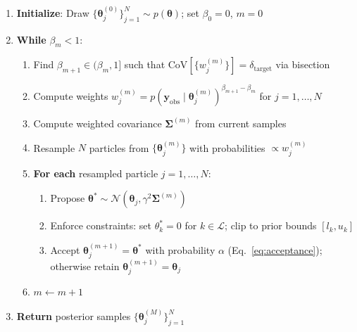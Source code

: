 \documentclass[11pt,a4paper]{article}
\begin{document}
\begin{algorithm}[htbp]
{\begin{minipage}{0.92\textwidth}
\begin{enumerate}
    \item[\textbf{1.}] \textbf{Initialize}: Draw $\{\boldsymbol{\theta}_j^{(0)}\}_{j=1}^{N} \sim p(\boldsymbol{\theta})$; set $\beta_0 = 0$, $m = 0$
    \item[\textbf{2.}] \textbf{While} $\beta_m < 1$:
    \begin{enumerate}
        \item[(a)] Find $\beta_{m+1} \in (\beta_m, 1]$ such that $\mathrm{CoV}[\{w_j^{(m)}\}] = \delta_{\mathrm{target}}$ via bisection
        \item[(b)] Compute weights $w_j^{(m)} = p(\mathbf{y}_{\mathrm{obs}} \mid \boldsymbol{\theta}_j^{(m)})^{\beta_{m+1} - \beta_m}$ for $j = 1, \ldots, N$
        \item[(c)] Compute weighted covariance $\boldsymbol{\Sigma}^{(m)}$ from current samples
        \item[(d)] Resample $N$ particles from $\{\boldsymbol{\theta}_j^{(m)}\}$ with probabilities $\propto w_j^{(m)}$
        \item[(e)] \textbf{For each} resampled particle $j = 1, \ldots, N$:
        \begin{enumerate}
            \item[i.] Propose $\boldsymbol{\theta}^* \sim \mathcal{N}(\boldsymbol{\theta}_j, \gamma^2 \boldsymbol{\Sigma}^{(m)})$
            \item[ii.] Enforce constraints: set $\theta_k^* = 0$ for $k \in \mathcal{L}$; clip to prior bounds $[l_k, u_k]$
            \item[iii.] Accept $\boldsymbol{\theta}_j^{(m+1)} = \boldsymbol{\theta}^*$ with probability $\alpha$ (Eq.~\ref{eq:acceptance}); otherwise retain $\boldsymbol{\theta}_j^{(m+1)} = \boldsymbol{\theta}_j$
        \end{enumerate}
        \item[(f)] $m \leftarrow m + 1$
    \end{enumerate}
    \item[\textbf{3.}] \textbf{Return} posterior samples $\{\boldsymbol{\theta}_j^{(M)}\}_{j=1}^{N}$
\end{enumerate}
\vspace{0.2cm}
\end{minipage}}
\caption{TMCMC algorithm with biological constraint enforcement. Step~2(e)(ii) ensures that locked parameters remain at zero and all free parameters respect their condition-specific prior bounds throughout the sampling process.}
\label{alg:tmcmc}
\end{algorithm}
\end{document}

